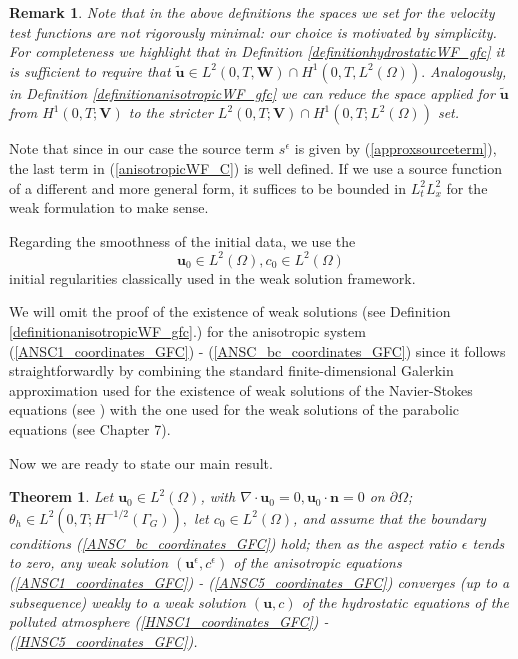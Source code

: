 \documentclass[12pt]{report}
\newtheorem{theorem}{Theorem}
\numberwithin{theorem}{chapter}
\numberwithin{corollary}{chapter}
\numberwithin{lemma}{chapter}
\newtheorem{remark}{Remark}
\numberwithin{remark}{chapter}
\numberwithin{definition}{chapter}
\numberwithin{prop}{chapter}
\begin{document}
\begin{remark}
Note that in the above definitions the spaces we set for the velocity test functions are not rigorously minimal: our choice is motivated by simplicity. For completeness we highlight that in Definition \ref{definitionhydrostaticWF_gfc} it is sufficient to require that $\mathbf{\tilde{u}} \in L^2 (0,T, \mathbf{W}) \cap H^1(0,T, L^2(\Omega)).$ Analogously, in Definition \ref{definitionanisotropicWF_gfc} we can reduce the space applied for $\mathbf{\tilde{u}}$ from $H^1 (0,T;\mathbf{V})$ to the stricter $L^2 (0,T;\mathbf{V}) \cap H^1 (0,T; L^2(\Omega))$ set.
\end{remark}

Note that since in our case the source term $s^\epsilon$ is given by (\ref{approxsourceterm}), the last term in (\ref{anisotropicWF_C}) is well defined. If we use a source function of a different and more general form, it suffices to be bounded in $L_t^2 L_x^2$ for the weak formulation to make sense.

Regarding the smoothness of the initial data, we use the
%
\begin{equation}\label{initialregularities_weak_gfc}
\mathbf{u}_0 \in L^2 (\Omega), c_0 \in L^2 (\Omega)
\end{equation}
%
initial regularities classically used in the weak solution framework.

We will omit the proof of the existence of weak solutions (see Definition \ref{definitionanisotropicWF_gfc}.) for the anisotropic system (\ref{ANSC1_coordinates_GFC}) - (\ref{ANSC_bc_coordinates_GFC}) since it follows straightforwardly by combining  the standard finite-dimensional Galerkin approximation used for the existence of weak solutions of the Navier-Stokes equations (see \cite{temam2001navier}) with the one used for the weak solutions of the parabolic equations (see \cite{evans2010partial} Chapter 7).

Now we are ready to state our main result.

\begin{theorem} \label{maintheorem_weak_GFC}
Let $\mathbf{u}_0 \in L^2 (\Omega)$, with $\nabla \cdot \mathbf{u}_0 = 0, \mathbf{u}_0 \cdot \mathbf{n} = 0$ on $\partial \Omega$; $\theta_h \in L^2(0,T; H^{-1/2}(\Gamma_G)),$ let $c_0 \in L^2 (\Omega)$, and assume that the boundary conditions (\ref{ANSC_bc_coordinates_GFC}) hold; then as the aspect ratio $\epsilon$ tends to zero, any weak solution $(\mathbf{u}^\epsilon, c^\epsilon)$ of the anisotropic equations (\ref{ANSC1_coordinates_GFC}) - (\ref{ANSC5_coordinates_GFC}) converges (up to a subsequence) weakly to a weak solution $(\mathbf{u}, c)$ of the hydrostatic equations of the polluted atmosphere (\ref{HNSC1_coordinates_GFC}) - (\ref{HNSC5_coordinates_GFC}).
\end{theorem}
\end{document}
